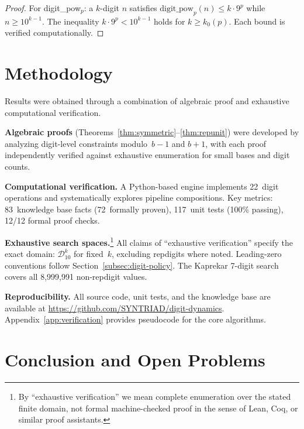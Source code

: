 \documentclass[11pt,a4paper]{amsart}
\theoremstyle{plain}
\theoremstyle{definition}
\theoremstyle{remark}
\begin{document}
\begin{proof}
For digit\_pow$_p$: a $k$-digit $n$ satisfies
$\text{digit\_pow}_p(n) \leq k \cdot 9^p$ while $n \geq 10^{k-1}$. The
inequality $k \cdot 9^p < 10^{k-1}$ holds for $k \geq k_0(p)$. Each bound
is verified computationally.
\end{proof}

\section{Methodology}\label{sec:methodology}

Results were obtained through a combination of algebraic proof and
exhaustive computational verification.

\textbf{Algebraic proofs} (Theorems~\ref{thm:symmetric}--\ref{thm:repunit})
were developed by analyzing digit-level constraints modulo~$b{-}1$ and
$b{+}1$, with each proof independently verified against exhaustive
enumeration for small bases and digit counts.

\textbf{Computational verification.}
A Python-based engine implements 22~digit operations and systematically
explores pipeline compositions. Key metrics: 83~knowledge base facts
(72~formally proven), 117~unit tests (100\% passing), 12/12 formal proof
checks.

\textbf{Exhaustive search spaces.}\footnote{By ``exhaustive verification'' we
mean complete enumeration over the stated finite domain, not formal
machine-checked proof in the sense of Lean, Coq, or similar proof assistants.}
All claims of ``exhaustive verification''
specify the exact domain: $\mathcal{D}_{10}^k$ for fixed~$k$, excluding
repdigits where noted. Leading-zero conventions follow
Section~\ref{subsec:digit-policy}. The Kaprekar 7-digit search covers all
8{,}999{,}991 non-repdigit values.

\textbf{Reproducibility.}
All source code, unit tests, and the knowledge base
are available at \url{https://github.com/SYNTRIAD/digit-dynamics}.
Appendix~\ref{app:verification} provides pseudocode for the core algorithms.

\section{Conclusion and Open Problems}\label{sec:conclusion}
\end{document}
